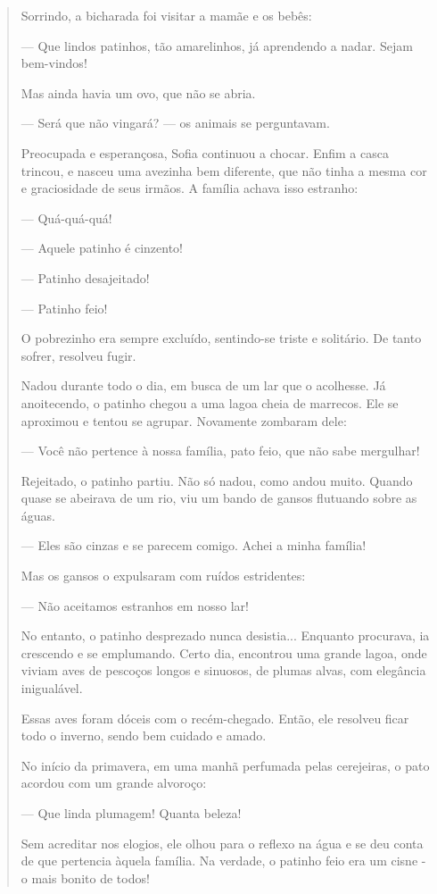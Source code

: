 \begin{escolha}
\begin{quote}
Sorrindo, a bicharada foi visitar a mamãe e os bebês:

--- Que lindos patinhos, tão amarelinhos, já aprendendo a nadar. Sejam
bem-vindos!

Mas ainda havia um ovo, que não se abria.

--- Será que não vingará? --- os animais se perguntavam.

Preocupada e esperançosa, Sofia continuou a chocar. Enfim a casca
trincou, e nasceu uma avezinha bem diferente, que não tinha a mesma cor
e graciosidade de seus irmãos. A família achava isso estranho:

--- Quá-quá-quá!

--- Aquele patinho é cinzento!

--- Patinho desajeitado!

--- Patinho feio!

O pobrezinho era sempre excluído, sentindo-se triste e solitário. De
tanto sofrer, resolveu fugir.

Nadou durante todo o dia, em busca de um lar que o acolhesse. Já
anoitecendo, o patinho chegou a uma lagoa cheia de marrecos. Ele se
aproximou e tentou se agrupar. Novamente zombaram dele:

--- Você não pertence à nossa família, pato feio, que não sabe
mergulhar!

Rejeitado, o patinho partiu. Não só nadou, como andou muito. Quando
quase se abeirava de um rio, viu um bando de gansos flutuando sobre as
águas.

--- Eles são cinzas e se parecem comigo. Achei a minha família!

Mas os gansos o expulsaram com ruídos estridentes:

--- Não aceitamos estranhos em nosso lar!

No entanto, o patinho desprezado nunca desistia... Enquanto procurava,
ia crescendo e se emplumando. Certo dia, encontrou uma grande lagoa,
onde viviam aves de pescoços longos e sinuosos, de plumas alvas, com
elegância inigualável.

Essas aves foram dóceis com o recém-chegado. Então, ele resolveu ficar
todo o inverno, sendo bem cuidado e amado.

No início da primavera, em uma manhã perfumada pelas cerejeiras, o pato
acordou com um grande alvoroço:

--- Que linda plumagem! Quanta beleza!

Sem acreditar nos elogios, ele olhou para o reflexo na água e se deu
conta de que pertencia àquela família. Na verdade, o patinho feio era um
cisne - o mais bonito de todos!


\end{quote}
\end{escolha}
